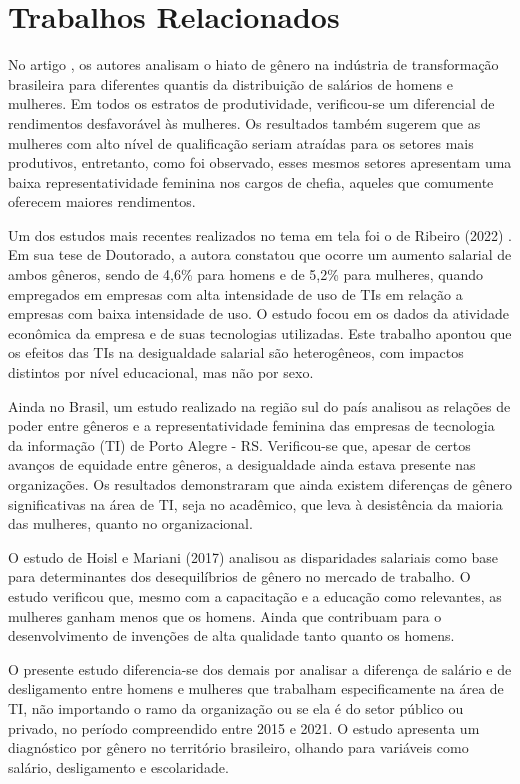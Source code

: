 \section{Trabalhos Relacionados}

No artigo \cite{de2021evidencias}, os autores analisam o hiato de gênero na indústria de transformação brasileira para diferentes quantis da distribuição de salários de homens e mulheres. Em todos os estratos de produtividade, verificou-se um diferencial de rendimentos desfavorável às mulheres.
Os resultados também sugerem que as mulheres com alto nível de
qualificação seriam atraídas para os setores mais produtivos, entretanto, como foi observado, esses mesmos setores apresentam uma baixa representatividade feminina nos cargos de chefia, aqueles que comumente oferecem maiores rendimentos.

Um dos estudos mais recentes realizados no tema em tela foi o de Ribeiro (2022) \cite{ribeiro2022efeitos}. Em sua tese de Doutorado, a autora constatou que ocorre um aumento salarial de ambos gêneros, sendo de 4,6\% para homens e de 5,2\% para mulheres, quando empregados em empresas com alta intensidade de uso de TIs em relação a empresas com baixa intensidade de uso. O estudo focou em os dados da atividade econômica da empresa e de suas tecnologias utilizadas. Este trabalho apontou que os efeitos das TIs na desigualdade salarial são heterogêneos, com impactos distintos por nível educacional, mas não por sexo. 

Ainda no Brasil, um estudo realizado na região sul do país \cite{camargo2019relaccoes} analisou as relações de poder entre gêneros e a representatividade feminina das empresas de tecnologia da informação (TI) de Porto Alegre - RS. Verificou-se que, apesar de certos avanços de equidade entre gêneros, a desigualdade ainda estava presente nas organizações. Os resultados demonstraram que ainda existem diferenças de gênero significativas na área de TI, seja no acadêmico, que leva à desistência da maioria das mulheres, quanto no organizacional. 

O estudo de Hoisl e Mariani (2017) \cite{hoisl2017sa} analisou as disparidades salariais como base para determinantes dos desequilíbrios de gênero no mercado de trabalho. O estudo verificou que, mesmo com a capacitação e a educação como relevantes, as mulheres ganham menos que os homens. Ainda que contribuam para o desenvolvimento de invenções de alta qualidade tanto quanto os homens.

O presente estudo diferencia-se dos demais por analisar a diferença de salário e de desligamento entre homens e mulheres que trabalham especificamente na área de TI, não importando o ramo da organização ou se ela é do setor público ou privado, no período compreendido entre 2015 e 2021. O estudo apresenta um diagnóstico por gênero no território brasileiro, olhando para variáveis como salário, desligamento e escolaridade.
